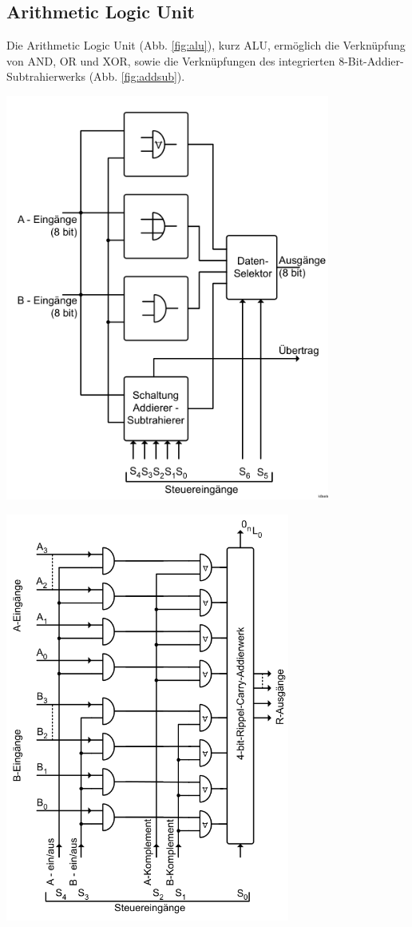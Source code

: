 \documentclass[10pt]{article}
\newenvironment{Figure}
  {\par\medskip\noindent\minipage{\linewidth}}
  {\endminipage\par\medskip}
\begin{document}
\begin{multicols}{2}
  \subsection{Arithmetic Logic Unit}
  Die Arithmetic Logic Unit (Abb. \ref{fig:alu}), kurz ALU, ermöglich die Verknüpfung von AND, OR und XOR, sowie die Verknüpfungen des integrierten 8-Bit-Addier-Subtrahierwerks (Abb. \ref{fig:addsub}). 
  \begin{Figure}
    \centering\includegraphics[width=0.8\textwidth]{alu.png}
    \label{fig:alu}
  \end{Figure}
  \begin{Figure}
    \centering\includegraphics[width=0.7\textwidth]{addier-subtrahierwerk.png}

\end{Figure}
\end{multicols}
\end{document}
